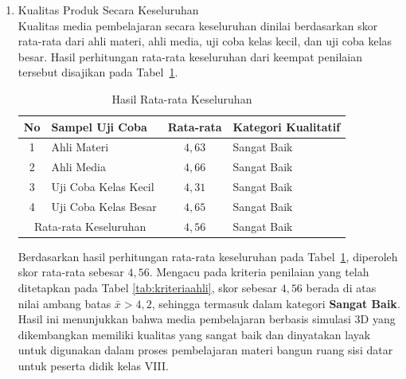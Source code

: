 \begin{enumerate}
\begin{table}[H]
\begin{tabular}{|c|l|c|l|}
        \end{tabular}
    \end{table}
    Hasil uji coba kelas besar menunjukkan bahwa skor rata-rata respons peserta didik sebesar \(4{,}65\). Mengacu pada kriteria penilaian yang ditetapkan pada Tabel \ref{tab:kriteriaahli}, skor sebesar \(4{,}65\) berada di atas nilai ambang batas \(\bar{x} > 4{,}2\), sehingga termasuk dalam kategori \textbf{Sangat Baik}. Peserta didik memberikan umpan balik positif, meliputi pernyataan bahwa materi mudah dipahami, media pembelajaran menarik, dan simulasi 3D dapat meningkatkan motivasi belajar. Meskipun demikian, beberapa peserta didik memberikan rekomendasi untuk menambah jumlah contoh soal dengan tujuan meningkatkan pemahaman konsep. Dokumentasi lengkap dari komentar dan saran peserta didik tersaji secara rinci dalam lampiran penelitian ini.
    \item Kualitas Produk Secara Keseluruhan\\
    \hspace*{1cm}Kualitas media pembelajaran secara keseluruhan dinilai berdasarkan skor rata-rata dari ahli materi, ahli media, uji coba kelas kecil, dan uji coba kelas besar. Hasil perhitungan rata-rata keseluruhan dari keempat penilaian tersebut disajikan pada Tabel~\ref{ratakeseluruhan}.\\
    \begin{table}[H]
        \centering
        \caption{Hasil Rata-rata Keseluruhan}
        \label{ratakeseluruhan}
        \begin{tabular}{|c|l|c|l|}
            \hline
            \textbf{No} & \textbf{Sampel Uji Coba} & \textbf{Rata-rata} & \textbf{Kategori Kualitatif}\\
            \hline
            1 & Ahli Materi & \(4{,}63\) & Sangat Baik\\
            2 & Ahli Media & \( 4{,}66 \) & Sangat Baik\\
            3 & Uji Coba Kelas Kecil & \(4{,}31\) & Sangat Baik\\
            4 & Uji Coba Kelas Besar & \( 4{,}65 \) & Sangat Baik\\
            \hline
            \multicolumn{2}{|c|}{Rata-rata Keseluruhan} & \(4{,}56\) & Sangat Baik\\
            \hline
            
        \end{tabular}
    \end{table}
    \hspace*{1cm}Berdasarkan hasil perhitungan rata-rata keseluruhan pada Tabel~\ref{ratakeseluruhan}, diperoleh skor rata-rata sebesar \(4{,}56\). Mengacu pada kriteria penilaian yang telah ditetapkan pada Tabel \ref{tab:kriteriaahli}, skor sebesar \(4{,}56\) berada di atas nilai ambang batas \(\bar{x} > 4{,}2\), sehingga termasuk dalam kategori \textbf{Sangat Baik}. Hasil ini menunjukkan bahwa media pembelajaran berbasis simulasi 3D yang dikembangkan memiliki kualitas yang sangat baik dan dinyatakan layak untuk digunakan dalam proses pembelajaran materi bangun ruang sisi datar untuk peserta didik kelas VIII.

\end{enumerate}
